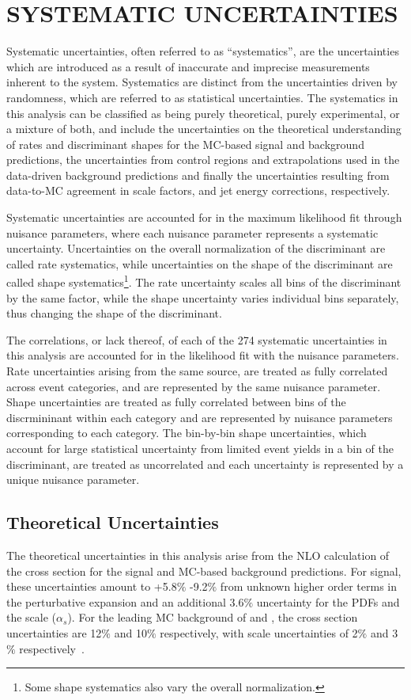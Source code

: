 %
%

\chapter{SYSTEMATIC UNCERTAINTIES}
Systematic uncertainties, often referred to as ``systematics'', are the uncertainties which are introduced as a result of inaccurate and imprecise measurements
inherent to the system. Systematics are distinct from the uncertainties driven by randomness, which are referred to as statistical uncertainties.
The systematics in this analysis can be classified as being purely theoretical, purely experimental, or a mixture of both, and include
the uncertainties on the theoretical understanding of rates and discriminant shapes for the MC-based signal and background predictions,
the uncertainties from control regions and extrapolations used in the data-driven background predictions
and finally the uncertainties resulting from data-to-MC agreement in scale factors, and jet energy corrections, respectively.

Systematic uncertainties are accounted for in the maximum likelihood fit through nuisance parameters, where each nuisance parameter represents a systematic uncertainty.
Uncertainties on the overall normalization of the discriminant are called rate systematics, while uncertainties on
the shape of the discriminant are called shape systematics\footnote{Some shape systematics also vary the overall normalization.}.
The rate uncertainty scales all bins of the discriminant by the same factor, while the shape uncertainty varies individual bins separately,
thus changing the shape of the discriminant.

The correlations, or lack thereof, of each of the 274 systematic uncertainties in this analysis are accounted for in the likelihood fit with the nuisance parameters. 
Rate uncertainties arising from the same source, are treated as fully correlated across event categories, and are represented by the same nuisance parameter.
Shape uncertainties are treated as fully correlated between bins of the discrmininant within each category and are represented by nuisance parameters corresponding to
each category. The bin-by-bin shape uncertainties, which account for large statistical uncertainty from limited event yields in a bin of the discriminant, are treated as uncorrelated
and each uncertainty is represented by a unique nuisance parameter.  


\section{Theoretical Uncertainties}
The theoretical uncertainties in this analysis arise from the NLO calculation of the cross section for the signal and MC-based background predictions.
For \tth signal, these uncertainties amount to +5.8$\%$ -9.2$\%$ from unknown higher order terms in the perturbative expansion and an additional 3.6$\%$ uncertainty for the
PDFs and the scale ($\alpha_{s}$). For the leading MC background of \ttw and \ttz, the cross section uncertainties are 12$\%$ and 10$\%$ respectively, with
scale uncertainties of 2$\%$ and 3$\%$ respectively~\cite{xsec_uncert}.

